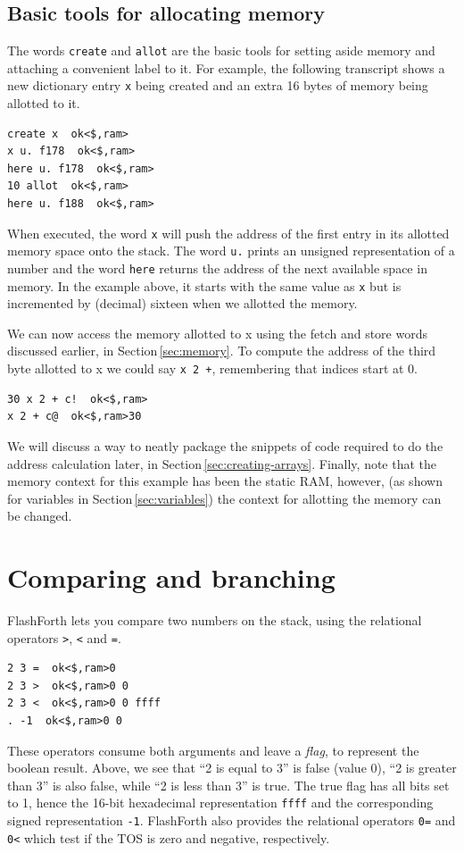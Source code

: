\documentclass[12pt,a4paper]{article}
\begin{document}
\medskip
\subsection{Basic tools for allocating memory}
\label{sec:allocating-memory}
%
The words \verb!create! and \verb!allot! are the basic tools for setting aside memory
and attaching a convenient label to it.
For example, the following transcript shows a new dictionary entry \verb!x! being created 
and an extra 16 bytes of memory being allotted to it.
\begin{verbatim}
create x  ok<$,ram>
x u. f178  ok<$,ram>
here u. f178  ok<$,ram>
10 allot  ok<$,ram>
here u. f188  ok<$,ram>
\end{verbatim}
When executed, the word \verb!x! will push the address of the first entry 
in its allotted memory space onto the stack.
The word \verb!u.! prints an unsigned representation of a number and 
the word \verb!here! returns the address of the next available space in memory.
In the example above, it starts with the same value as \verb!x! but is incremented 
by (decimal) sixteen when we allotted the memory.

\medskip
We can now access the memory allotted to x using the fetch and store words 
discussed earlier, in Section\,\ref{sec:memory}.
To compute the address of the third byte allotted to x we could say \verb!x 2 +!,
remembering that indices start at 0.
\begin{verbatim}
30 x 2 + c!  ok<$,ram>
x 2 + c@  ok<$,ram>30 
\end{verbatim}
We will discuss a way to neatly package the snippets of code required to do the address
calculation later, in Section\,\ref{sec:creating-arrays}.
Finally, note that the memory context for this example has been the static RAM, however, 
(as shown for variables in Section\,\ref{sec:variables})
the context for allotting the memory can be changed.


\bigskip
\section{Comparing and branching}
\label{sec:comparing-branching}
%
FlashForth lets you compare two numbers on the stack, using the relational
operators \verb!>!, \verb!<! and \verb!=!.
\begin{verbatim}
2 3 =  ok<$,ram>0 
2 3 >  ok<$,ram>0 0 
2 3 <  ok<$,ram>0 0 ffff 
. -1  ok<$,ram>0 0 
\end{verbatim}
These operators consume both arguments and leave a \textit{flag}, 
to represent the boolean result.
Above, we see that ``2 is equal to 3'' is false (value 0),
``2 is greater than 3'' is also false, while
``2 is less than 3'' is true.
The true flag has all bits set to 1, hence the 16-bit hexadecimal representation \verb!ffff!
and the corresponding signed representation \verb!-1!.
FlashForth also provides the relational operators \verb!0=! and \verb!0<!
which test if the TOS is zero and negative, respectively.
\end{document}
